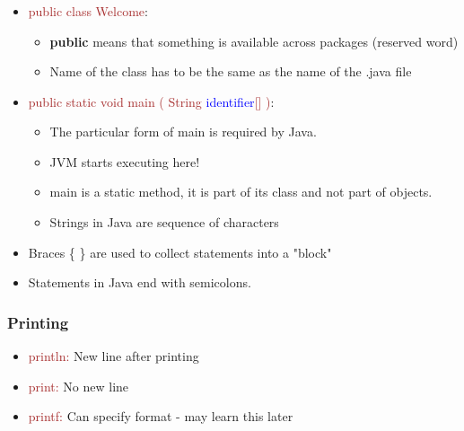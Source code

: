 \documentclass{beamer}
\begin{document}
\begin{frame}
  \frametitle{}
  	\begin{itemize}
		\item \textcolor{brown}{public class Welcome}: 
		\begin{itemize}
		\item \textbf{public} means that something is available across packages (reserved word)
		\item Name of the class has to be the same as the name of the .java file 
		\end{itemize}
		\pause
		\item \textcolor{brown}{public static void main ( String \textcolor{blue}{identifier}[] )}: \\
		\begin{itemize}
		\item The particular form of main is required by Java.
		\item JVM starts executing here! 
		\item main is a static method, it is part of its class and not part of objects. 
		\item Strings in Java are sequence of characters	
		\end{itemize}
		\pause
		\item Braces \{   \} are used to collect statements into a "block" 
		\pause
		\item Statements in Java end with semicolons. 
    \end{itemize}
\end{frame}
\begin{frame}
  \frametitle{Printing}
  \begin{itemize}
		\item \textcolor{brown}{println:} New line after printing
		\item \textcolor{brown}{print:} No new line
		\item \textcolor{brown}{printf:} Can specify format - may learn this later
    \end{itemize}
\end{frame}
\end{document}
